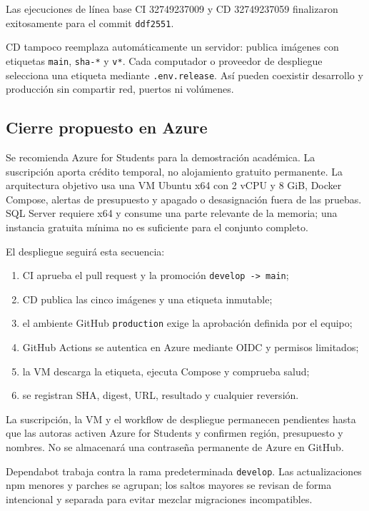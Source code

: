 \documentclass[11pt,letterpaper]{article}
\newcommand{\file}[1]{\texttt{#1}}
\begin{document}
Las ejecuciones de línea base CI 32749237009 y CD 32749237059 finalizaron exitosamente para el commit \file{ddf2551}.

CD tampoco reemplaza automáticamente un servidor: publica imágenes con etiquetas \file{main}, \file{sha-*} y \file{v*}. Cada computador o proveedor de despliegue selecciona una etiqueta mediante \file{.env.release}. Así pueden coexistir desarrollo y producción sin compartir red, puertos ni volúmenes.

\subsection{Cierre propuesto en Azure}

Se recomienda Azure for Students para la demostración académica. La suscripción aporta crédito temporal, no alojamiento gratuito permanente. La arquitectura objetivo usa una VM Ubuntu x64 con 2 vCPU y 8 GiB, Docker Compose, alertas de presupuesto y apagado o desasignación fuera de las pruebas. SQL Server requiere x64 y consume una parte relevante de la memoria; una instancia gratuita mínima no es suficiente para el conjunto completo.

El despliegue seguirá esta secuencia:

\begin{enumerate}
  \item CI aprueba el pull request y la promoción \file{develop -> main};
  \item CD publica las cinco imágenes y una etiqueta inmutable;
  \item el ambiente GitHub \file{production} exige la aprobación definida por el equipo;
  \item GitHub Actions se autentica en Azure mediante OIDC y permisos limitados;
  \item la VM descarga la etiqueta, ejecuta Compose y comprueba salud;
  \item se registran SHA, digest, URL, resultado y cualquier reversión.
\end{enumerate}

La suscripción, la VM y el workflow de despliegue permanecen pendientes hasta que las autoras activen Azure for Students y confirmen región, presupuesto y nombres. No se almacenará una contraseña permanente de Azure en GitHub.

Dependabot trabaja contra la rama predeterminada \file{develop}. Las actualizaciones npm menores y parches se agrupan; los saltos mayores se revisan de forma intencional y separada para evitar mezclar migraciones incompatibles.
\end{document}
